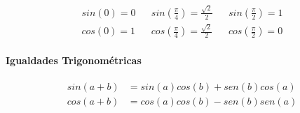 \documentclass{article}
\begin{document}
\begin{multicols}{2}
      \begin{align*}
        sin\left(0\right) = 0 && sin\left(\frac{\pi}{4}\right) = \frac{\sqrt{2}}{2} && sin\left(\frac{\pi}{2}\right) = 1 \\
        cos\left(0\right) = 1 && cos\left(\frac{\pi}{4}\right) = \frac{\sqrt{2}}{2} && cos\left(\frac{\pi}{2}\right) = 0
      \end{align*}

      \paragraph{Igualdades Trigonométricas}

      \begin{align*}
        sin(a + b) &= sin(a)cos(b) + sen(b)cos(a) \\
        cos(a + b) &= cos(a)cos(b) - sen(b)sen(a)
      \end{align*}
  \end{multicols}
\end{document}
